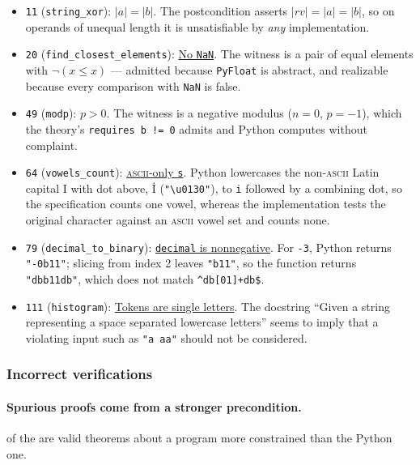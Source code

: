 \documentclass[11pt,letterpaper]{article}
\begin{document}
\begin{itemize}
\item \texttt{11} (\texttt{string\_xor}): \underline{$|a| = |b|$}. The postcondition asserts
  $|\mathit{rv}| = |a| = |b|$, so on operands of unequal length it is
  unsatisfiable by \emph{any} implementation.
\item \texttt{20} (\texttt{find\_closest\_elements}): \underline{No \texttt{NaN}}. The
  witness is a pair of equal elements with $\neg(x \le x)$ --- admitted because
  \texttt{PyFloat} is abstract, and realizable because every comparison with
  \texttt{NaN} is false.
\item \texttt{49} (\texttt{modp}): \underline{$p > 0$}. The witness is a negative modulus
  ($n=0$, $p=-1$), which the theory's \texttt{requires b != 0} admits and Python
  computes without complaint.
\item \texttt{64} (\texttt{vowels\_count}): \underline{\textsc{ascii}-only \texttt{s}}.
  Python lowercases the non-\textsc{ascii} Latin capital I with dot above,
  İ (\texttt{"\textbackslash u0130"}), to \texttt{i} followed by a combining dot,
  so the specification counts one vowel, whereas the implementation tests the
  original character against an \textsc{ascii} vowel set and counts none.
\item \texttt{79} (\texttt{decimal\_to\_binary}):
  \underline{\texttt{decimal} is nonnegative}. For \texttt{-3}, Python returns \texttt{"-0b11"};
  slicing from index 2 leaves \texttt{"b11"}, so the function returns
  \texttt{"dbb11db"}, which does not match
  \texttt{\textasciicircum db[01]+db\$}.
\item \texttt{111} (\texttt{histogram}): \underline{Tokens are single letters}. The docstring
  ``Given a string representing a space separated lowercase letters'' seems to imply
  that a violating input such as \texttt{"a aa"} should not be considered. 
\end{itemize}


\subsubsection{Incorrect verifications}

\paragraph{Spurious proofs come from a stronger precondition.} 
\castrongpre{} of the \anverifybad{} are valid
theorems about a program more constrained than the Python one.
\end{document}
